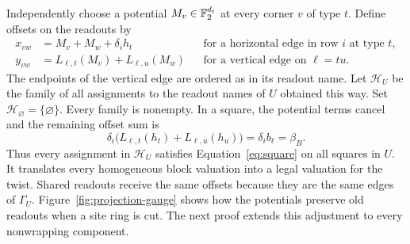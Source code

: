 Independently choose a potential $M_v\in\mathbb F_2^{d_t}$ at every corner $v$
of type $t$. Define offsets on the readouts by
\begin{equation}
\begin{aligned}
  x_{vw}&=M_v+M_w+\delta_i h_t
    &&\text{for a horizontal edge in row $i$ at type $t$},\\
  y_{vw}&=L_{\ell,t}(M_v)+L_{\ell,u}(M_w)
    &&\text{for a vertical edge on $\ell=tu$}.
\end{aligned}
\label{eq:potential-offsets}
\end{equation}
The endpoints of the vertical edge are ordered as in its readout name.
Let $\mathcal H_U$ be the family of all assignments to the readout names
of $U$ obtained this way. Set $\mathcal H_\varnothing=\{\varnothing\}$.
Every family is nonempty. In a square, the potential terms cancel and
the remaining offset sum is
\[
  \delta_i\bigl(L_{\ell,t}(h_t)+L_{\ell,u}(h_u)\bigr)
  =\delta_i b_\ell=\beta_B.
\]
Thus every assignment in $\mathcal H_U$ satisfies
Equation~\eqref{eq:square} on all squares in $U$. It translates every
homogeneous block valuation into a legal valuation for the twist.
Shared readouts receive the same offsets because they are the same
edges of $\Gamma_U$. Figure~\ref{fig:projection-gauge} shows how the
potentials preserve old readouts when a site ring is cut. The next proof
extends this adjustment to every nonwrapping component.

